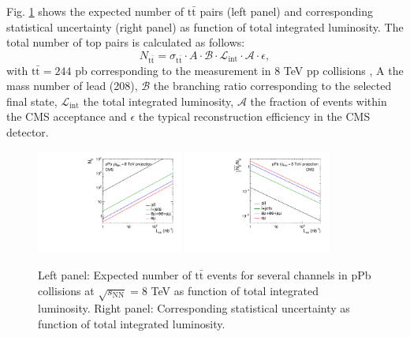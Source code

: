 Fig. \ref{fig:ttPPbProjections} shows the expected number of $\mathrm{t}\bar{\mathrm{t}}$ pairs (left panel) and corresponding statistical uncertainty (right panel) as function of total integrated luminosity. The total number of top pairs is calculated as follows:
\begin{equation}
N_{\mathrm{t}\bar{\mathrm{t}}} = \sigma_{\mathrm{t}\bar{\mathrm{t}}} \cdot A \cdot \mathcal{B} \cdot \mathcal{L}_{\mathrm{int}} \cdot \mathcal{A} \cdot \epsilon,
\end{equation}
with $\mathrm{t}\bar{\mathrm{t}}=244$ pb corresponding to the measurement in 8 TeV pp collisions \cite{Khachatryan:2016mqs}, A the mass number of lead (208), $\mathcal{B}$ the branching ratio corresponding to the selected final state, $\mathcal{L}_{\mathrm{int}}$ the total integrated luminosity, $\mathcal{A}$ the fraction of events within the CMS acceptance and $\epsilon$ the typical reconstruction efficiency in the CMS detector.
\begin{figure}[h!]
\begin{center}
  \includegraphics[width= 0.43\textwidth]{figures/top/ProjectedTTbarYield.pdf}
  \includegraphics[width= 0.43\textwidth]{figures/top/ProjectedTTbarStatUnc.pdf}
  \caption{Left panel: Expected number of $\mathrm{t}\bar{\mathrm{t}}$ events for several channels in pPb collisions at $\sqrt{s_{\mathrm{NN}}}=8$ TeV as function of total integrated luminosity. Right panel: Corresponding statistical uncertainty as function of total integrated luminosity.
  }
\label{fig:ttPPbProjections}
\end{center}
\end{figure}

